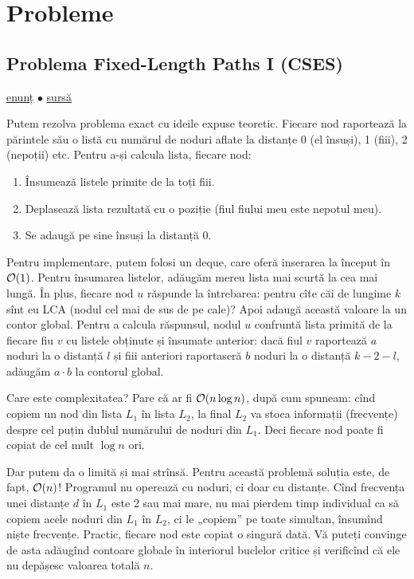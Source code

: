 \documentclass[../main.tex]{subfiles}
\begin{document}
\section{Probleme}

\subsection{Problema Fixed-Length Paths I (CSES)}
\label{problem:fixed-length-paths-1}

\href{https://cses.fi/problemset/task/2080}{enunț}
$\bullet$
\hyperref[code:fixed-length-paths-1]{sursă}

Putem rezolva problema exact cu ideile expuse teoretic. Fiecare nod raportează la părintele său o listă cu numărul de noduri aflate la distanțe 0 (el însuși), 1 (fiii), 2 (nepoții) etc. Pentru a-și calcula lista, fiecare nod:

\begin{enumerate}
  \item Însumează listele primite de la toți fiii.
  \item Deplasează lista rezultată cu o poziție (fiul fiului meu este nepotul meu).
  \item Se adaugă pe sine însuși la distanță 0.
\end{enumerate}

Pentru implementare, putem folosi un deque, care oferă inserarea la început în $\mathcal{O}(1)$. Pentru însumarea listelor, adăugăm mereu lista mai scurtă la cea mai lungă. În plus, fiecare nod $u$ răspunde la întrebarea: pentru cîte căi de lungime $k$ sînt eu LCA (nodul cel mai de sus de pe cale)? Apoi adaugă această valoare la un contor global. Pentru a calcula răspunsul, nodul $u$ confruntă lista primită de la fiecare fiu $v$ cu listele obținute și însumate anterior: dacă fiul $v$ raportează $a$ noduri la o distanță $l$ și fiii anteriori raportaseră $b$ noduri la o distanță $k-2-l$, adăugăm $a \cdot b$ la contorul global.

Care este complexitatea? Pare că ar fi $\mathcal{O}(n \log n)$, după cum spuneam: cînd copiem un nod din lista $L_1$ în lista $L_2$, la final $L_2$ va stoca informații (frecvențe) despre cel puțin dublul numărului de noduri din $L_1$. Deci fiecare nod poate fi copiat de cel mult $\log n$ ori.

Dar putem da o limită și mai strînsă. Pentru această problemă soluția este, de fapt, $\mathcal{O}(n)$! Programul nu operează cu noduri, ci doar cu distanțe. Cînd frecvența unei distanțe $d$ în $L_1$ este 2 sau mai mare, nu mai pierdem timp individual ca să copiem acele noduri din $L_1$ în $L_2$, ci le „copiem” pe toate simultan, însumînd niște frecvențe. Practic, fiecare nod este copiat o singură dată. Vă puteți convinge de asta adăugînd contoare globale în interiorul buclelor critice și verificînd că ele nu depășesc valoarea totală $n$.
\end{document}
